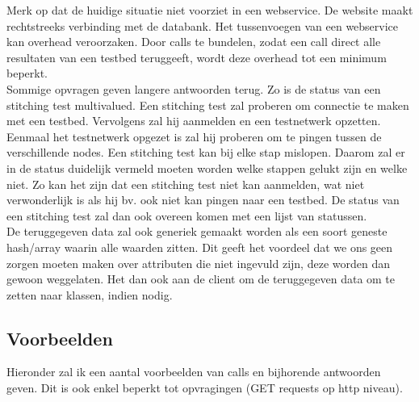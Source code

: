 \documentclass[11pt]{article}
\begin{document}
Merk op dat de huidige situatie niet voorziet in een webservice. De website maakt rechtstreeks verbinding met de databank. Het tussenvoegen van een webservice kan overhead veroorzaken. Door calls te bundelen, zodat een call direct alle resultaten van een testbed teruggeeft, wordt deze overhead tot een minimum beperkt.\\

Sommige opvragen geven langere antwoorden terug. Zo is de status van een stitching test multivalued. Een stitching test zal proberen om connectie te maken met een testbed. Vervolgens zal hij aanmelden en een testnetwerk opzetten. Eenmaal het testnetwerk opgezet is zal hij proberen om te pingen tussen de verschillende nodes. Een stitching test kan bij elke stap mislopen. Daarom zal er in de status duidelijk vermeld moeten worden welke stappen gelukt zijn en welke niet. Zo kan het zijn dat een stitching test niet kan aanmelden, wat niet verwonderlijk is als hij bv. ook niet kan pingen naar een testbed. De status van een stitching test zal dan ook overeen komen met een lijst van statussen.\\

De teruggegeven data zal ook generiek gemaakt worden als een soort geneste hash/array waarin alle waarden zitten. Dit geeft het voordeel dat we ons geen zorgen moeten maken over attributen die niet ingevuld zijn, deze worden dan gewoon weggelaten. Het dan ook aan de client om de teruggegeven data om te zetten naar klassen, indien nodig.

\clearpage
\subsection{Voorbeelden}
Hieronder zal ik een aantal voorbeelden van calls en bijhorende antwoorden geven.
Dit is ook enkel beperkt tot opvragingen (GET requests op http niveau).
\end{document}
